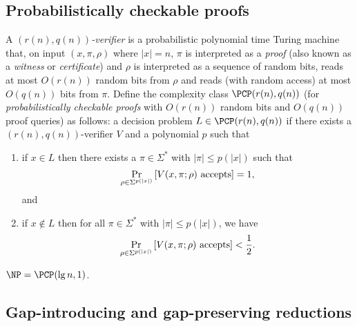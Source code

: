 \documentclass[]{article}
\begin{document}
\subsection{Probabilistically checkable proofs}

A \emph{$(r(n), q(n))$-verifier} is a probabilistic polynomial time Turing machine that, on input $(x, \pi, \rho)$ where $|x| = n$, $\pi$ is interpreted as a \emph{proof} (also known as a \emph{witness} or \emph{certificate}) and $\rho$ is interpreted as a sequence of random bits, reads at most $O(r(n))$ random bits from $\rho$ and reads (with random access) at most $O(q(n))$ bits from $\pi$.
Define the complexity class $\PCP(r(n), q(n))$ (for \emph{probabilistically checkable proofs} with $O(r(n))$ random bits and $O(q(n))$ proof queries) as follows: a decision problem $L \in \PCP(r(n), q(n))$ if there exists a $(r(n), q(n))$-verifier $V$ and a polynomial $p$ such that
\begin{enumerate}
\item
  if $x \in L$ then there exists a $\pi \in \Sigma^*$ with $|\pi| \leq p(|x|)$ such that
  \begin{displaymath}
    \Pr_{\rho \in \Sigma^{p(|x|)}}\left[V(x, \pi; \rho) \textnormal{ accepts}\right] = 1,
  \end{displaymath}
  and
\item
  if $x \notin L$ then for all $\pi \in \Sigma^*$ with $|\pi| \leq p(|x|)$, we have
  \begin{displaymath}
    \Pr_{\rho \in \Sigma^{p(|x|)}}\left[V(x, \pi; \rho) \textnormal{ accepts}\right] < \frac{1}{2}.
  \end{displaymath}
\end{enumerate}

\begin{theorem}\label{thm:pcp}
  $\NP = \PCP(\lg n, 1)$.
\end{theorem}

\subsection{Gap-introducing and gap-preserving reductions}\label{ssc:gaps}
\end{document}
